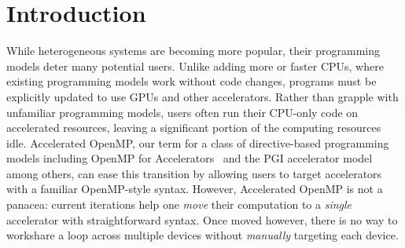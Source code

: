 \section{Introduction}
\label{sec:intro}






While heterogeneous systems are becoming more popular, their
programming models deter many potential users.  Unlike adding more or
faster CPUs, where existing programming models work without code changes,
programs must be
explicitly updated to use GPUs and other accelerators. Rather than
grapple with unfamiliar programming models, users often run their
CPU-only code on accelerated resources, leaving a significant portion
of the computing resources idle.  Accelerated
OpenMP, our term for a class of
directive-based programming models including OpenMP for
Accelerators~\cite{Beyer:2011ib} and the PGI accelerator
model~\cite{Wolfe:2010bk} among others, can ease this transition by
allowing users to target accelerators with a familiar OpenMP-style
syntax.
However, Accelerated OpenMP is not a panacea: current iterations help one
\emph{move} their computation to a \emph{single} accelerator with
straightforward syntax. Once
moved however, there is no way to workshare a
loop across multiple devices without \emph{manually} targeting each device.

